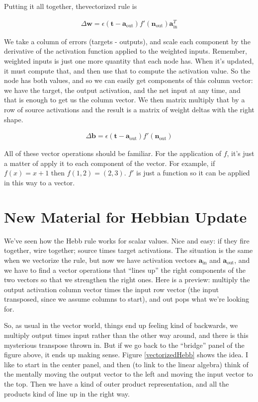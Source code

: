 Putting it all together, thevectorized rule is

\begin{eqnarray*}
\Delta \mathbf{w}  =  \epsilon (\mathbf{t} - \mathbf{a}_{\text{out}}) f'( \mathbf{n}_{\text{out}}) \mathbf{a}_{\text{in}}^T
\end{eqnarray*}

We take a column of errors (targets - outputs), and scale each component by the derivative of the activation function applied to the weighted inputs. Remember, weighted inputs is just one more quantity that each node has. When it's updated, it must compute that, and then use that to compute the activation value. So the node has both values, and so we can easily get components of this column vector: we have the target, the output activation, and the net input at any time, and that is enough to get us the column vector. We then matrix multiply that by a row of source activations and the result is a matrix of weight deltas with the right shape.

\begin{eqnarray*}
\Delta \mathbf{b}  =  \epsilon (\mathbf{t} - \mathbf{a}_{\text{out}}) f'( \mathbf{n}_{\text{out}})
\end{eqnarray*}

All of these vector operations should be familiar. For the application of $f$, it's just a matter of apply it to each component of the vector.  For example, if $f(x) = x+1$ then $f(1,2) = (2,3)$. $f'$ is just a function so it can be applied in this way to a vector.

\section{New Material for Hebbian Update}

We've seen how the Hebb rule works for scalar values. Nice and easy: if they fire together, wire together; source times target activations.  The situation is the same when we vectorize the rule, but now we have activation vectors $\mathbf{a}_{\text{in}}$ and $\mathbf{a}_{\text{out}}$, and we have to find a vector operations that ``lines up'' the right components of the two vectors so that we strengthen the right ones.  Here is a preview: multiply the output activation column vector times the input row vector (the input transposed, since we assume columns to start), and out pops what we're looking for. 

So, as usual in the vector world, things end up feeling kind of backwards, we multiply output times input rather than the other way around, and there is this mysterious transpose thrown in.  But if we go back to the ``bridge'' panel of the figure above, it ends up making sense. Figure \ref{vectorizedHebb} shows the idea. I like to start in the center panel, and then (to link to the linear algebra) think of the mentally moving the output vector to the left and moving the input vector to the top. Then we have a kind of outer product representation, and all the products kind of line up in the right way. 



